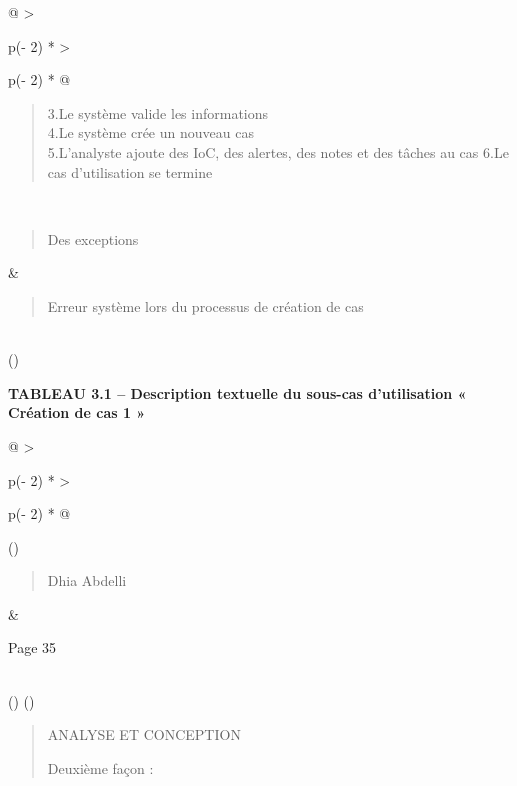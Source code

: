 \documentclass[
]{article}
\begin{document}
\begin{longtable}[]{@{}
  >{\raggedright\arraybackslash}p{(\columnwidth - 2\tabcolsep) * }
  >{\raggedright\arraybackslash}p{(\columnwidth - 2\tabcolsep) * }@{}}
\begin{minipage}[t]{\linewidth}
\begin{quote}
3.Le système valide les informations\\
4.Le système crée un nouveau cas\\
5.L'analyste ajoute des IoC, des alertes, des notes et des tâches au cas
6.Le cas d'utilisation se termine
\end{quote}\strut
\end{minipage} \\
\begin{minipage}[t]{\linewidth}\raggedright
\begin{quote}
Des exceptions
\end{quote}
\end{minipage} & \begin{minipage}[t]{\linewidth}\raggedright
\begin{quote}
Erreur système lors du processus de création de cas
\end{quote}
\end{minipage} \\
\bottomrule()
\end{longtable}

\textbf{TABLEAU 3.1 -- Description textuelle du sous-cas d'utilisation «
Création de cas 1 »}

\begin{longtable}[]{@{}
  >{\raggedright\arraybackslash}p{(\columnwidth - 2\tabcolsep) * }
  >{\raggedright\arraybackslash}p{(\columnwidth - 2\tabcolsep) * }@{}}
\toprule()
\begin{minipage}[b]{\linewidth}\raggedright
\begin{quote}
Dhia Abdelli
\end{quote}
\end{minipage} & \begin{minipage}[b]{\linewidth}\raggedright
Page 35
\end{minipage} \\
\midrule()
\endhead
\bottomrule()
\end{longtable}

\begin{quote}
ANALYSE ET CONCEPTION

Deuxième façon :
\end{quote}
\end{document}
